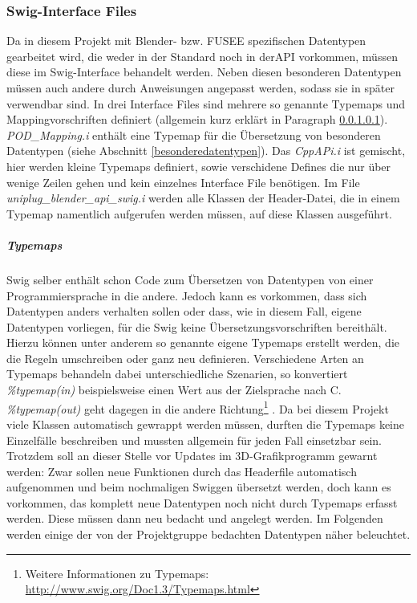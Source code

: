 \subsubsection{Swig-Interface Files}\label{subsubsec:swiginterface}
Da in diesem Projekt mit Blender- bzw. FUSEE spezifischen Datentypen gearbeitet wird, die weder in der Standard \CC noch in der\CS API vorkommen, müssen diese im Swig-Interface behandelt werden. Neben diesen besonderen Datentypen müssen auch andere durch Anweisungen angepasst werden, sodass sie in \CS später verwendbar sind. In drei Interface Files sind mehrere so genannte Typemaps und Mappingvorschriften definiert (allgemein kurz erklärt in Paragraph \ref{typemaps}). \emph{POD\_Mapping.i} enthält eine Typemap für die Übersetzung von besonderen Datentypen (siehe Abschnitt \ref{besonderedatentypen}). Das \emph{CppAPi.i} ist gemischt, hier werden kleine Typemaps definiert, sowie verschidene Defines die nur über wenige Zeilen gehen und kein einzelnes Interface File benötigen. Im File \emph{uniplug\_blender\_api\_swig.i} werden alle Klassen der Header-Datei, die in einem Typemap namentlich aufgerufen werden müssen, auf diese Klassen ausgeführt.

\subparagraph{Typemaps}\label{typemaps}
Swig selber enthält schon Code zum Übersetzen von Datentypen von einer Programmiersprache in die andere. Jedoch kann es vorkommen, dass sich Datentypen anders verhalten sollen oder dass, wie in diesem Fall, eigene Datentypen vorliegen, für die Swig keine Übersetzungsvorschriften bereithält. Hierzu können unter anderem so genannte eigene Typemaps erstellt werden, die die Regeln umschreiben oder ganz neu definieren. Verschiedene Arten an Typemaps behandeln dabei unterschiedliche Szenarien, so konvertiert \emph{\%typemap(in)} beispielsweise einen Wert aus der Zielsprache nach C. \emph{\%typemap(out)} geht dagegen in die andere Richtung\footnote{Weitere Informationen zu Typemaps: \url{http://www.swig.org/Doc1.3/Typemaps.html}} . Da bei diesem Projekt viele Klassen automatisch gewrappt werden müssen, durften die Typemaps keine Einzelfälle beschreiben und mussten allgemein für jeden Fall einsetzbar sein. Trotzdem soll an dieser Stelle vor Updates im 3D-Grafikprogramm gewarnt werden: Zwar sollen neue Funktionen durch das Headerfile automatisch aufgenommen und beim nochmaligen Swiggen übersetzt werden, doch kann es vorkommen, das komplett neue Datentypen noch nicht durch Typemaps erfasst werden. Diese müssen dann neu bedacht und angelegt werden. Im Folgenden werden einige der von der Projektgruppe bedachten Datentypen näher beleuchtet.

